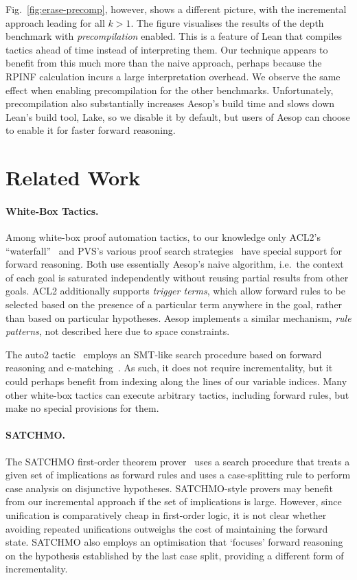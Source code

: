 \documentclass[runningheads,leqno]{llncs}
\newcommand{\para}[1]{\paragraph{\bfseries\upshape #1}}
\begin{document}
Fig.~\ref{fig:erase-precomp}, however, shows a different picture, with the incremental approach leading for all $k > 1$.
The figure visualises the results of the depth benchmark with \emph{precompilation} enabled.
This is a feature of Lean that compiles tactics ahead of time instead of interpreting them.
Our technique appears to benefit from this much more than the naive approach, perhaps because the RPINF calculation incurs a large interpretation overhead.
We observe the same effect when enabling precompilation for the other benchmarks.
Unfortunately, precompilation also substantially increases Aesop's build time and slows down Lean's build tool, Lake, so we disable it by default, but users of Aesop can choose to enable it for faster forward reasoning.

\section{Related Work}

\para{White-Box Tactics.}
Among white-box proof automation tactics, to our knowledge only ACL2's \enquote{waterfall}~\cite{ACL2} and PVS's various proof search strategies~\cite{PVS} have special support for forward reasoning.
Both use essentially Aesop's naive algorithm, i.e.\ the context of each goal is saturated independently without reusing partial results from other goals.
ACL2 additionally supports \emph{trigger terms}, which allow forward rules to be selected based on the presence of a particular term anywhere in the goal, rather than based on particular hypotheses.
Aesop implements a similar mechanism, \emph{rule patterns}, not described here due to space constraints.

The auto2 tactic~\cite{auto2} employs an SMT-like search procedure based on forward reasoning and e-matching~\cite{simplify}.
As such, it does not require incrementality, but it could perhaps benefit from indexing along the lines of our variable indices.
Many other white-box tactics can execute arbitrary tactics, including forward rules, but make no special provisions for them.

\para{SATCHMO.}
The SATCHMO first-order theorem prover~\cite{SATCHMO} uses a search procedure that treats a given set of implications as forward rules and uses a case-splitting rule to perform case analysis on disjunctive hypotheses.
SATCHMO-style provers may benefit from our incremental approach if the set of implications is large.
However, since unification is comparatively cheap in first-order logic, it is not clear whether avoiding repeated unifications outweighs the cost of maintaining the forward state.
SATCHMO also employs an optimisation that \enquote*{focuses} forward reasoning on the hypothesis established by the last case split, providing a different form of incrementality.
\end{document}
